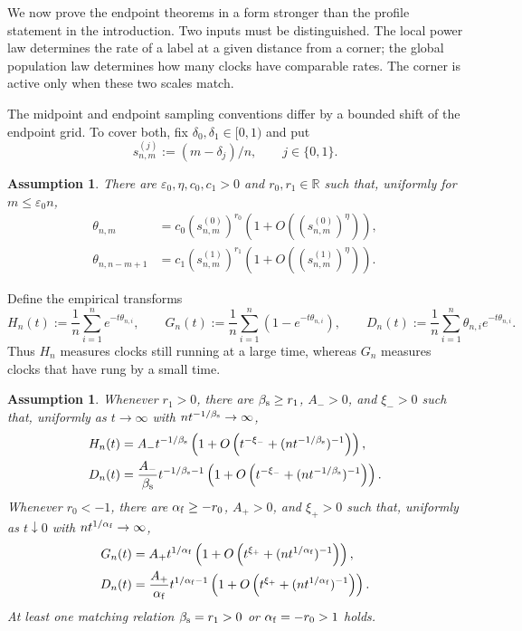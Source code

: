 \documentclass[11pt]{article}
\theoremstyle{remark}
\theoremstyle{plain}
\newtheorem{assumption}[theorem]{Assumption}
\newcommand{\R}{\mathbb R}
\newcommand{\eps}{\varepsilon}
\begin{document}
We now prove the endpoint theorems in a form stronger than the profile
statement in the introduction.  Two inputs must be distinguished.  The local
power law determines the rate of a label at a given distance from a corner;
the global population law determines how many clocks have comparable rates.
The corner is active only when these two scales match.

The midpoint and endpoint sampling conventions differ by a bounded shift of
the endpoint grid.  To cover both, fix $\delta_0,\delta_1\in[0,1)$ and put
\[
 s_{n,m}^{(j)}:=(m-\delta_j)/n,
 \qquad j\in\{0,1\}.
\]

\begin{assumption}\label{ass:power-endpoints}
There are $\eps_0,\eta,c_0,c_1>0$ and $r_0,r_1\in\R$ such that, uniformly for
$m\le \eps_0n$,
\begin{align}
 \theta_{n,m}&=c_0(s_{n,m}^{(0)})^{r_0}
   (1+O((s_{n,m}^{(0)})^{\eta})),\label{eq:left-endpoint-power}\\
 \theta_{n,n-m+1}&=c_1(s_{n,m}^{(1)})^{r_1}
   (1+O((s_{n,m}^{(1)})^{\eta})).\label{eq:right-endpoint-power}
\end{align}
\end{assumption}

Define the empirical transforms
\begin{equation}\label{eq:population-transforms}
 H_n(t):=\frac1n\sum_{i=1}^ne^{-t\theta_{n,i}},\qquad
 G_n(t):=\frac1n\sum_{i=1}^n(1-e^{-t\theta_{n,i}}),\qquad
 D_n(t):=\frac1n\sum_{i=1}^n\theta_{n,i}e^{-t\theta_{n,i}}.
\end{equation}
Thus $H_n$ measures clocks still running at a large time, whereas $G_n$
measures clocks that have rung by a small time.

\begin{assumption}\label{ass:power-population}
Whenever $r_1>0$, there are $\beta_{\rm s}\ge r_1$, $A_->0$, and $\xi_->0$
such that, uniformly as $t\to\infty$ with
$nt^{-1/\beta_{\rm s}}\to\infty$,
\begin{align}
 H_n(t)&=A_-t^{-1/\beta_{\rm s}}
 \left(1+O\left(t^{-\xi_-}
 +(nt^{-1/\beta_{\rm s}})^{-1}\right)\right),
 \label{eq:power-discrete-laplace}\\
 D_n(t)&=\frac{A_-}{\beta_{\rm s}}t^{-1/\beta_{\rm s}-1}
 \left(1+O\left(t^{-\xi_-}
 +(nt^{-1/\beta_{\rm s}})^{-1}\right)\right).
 \label{eq:power-discrete-weighted-laplace}
\end{align}
Whenever $r_0<-1$, there are $\alpha_{\rm f}\ge-r_0$, $A_+>0$, and
$\xi_+>0$ such that, uniformly as $t\downarrow0$ with
$nt^{1/\alpha_{\rm f}}\to\infty$,
\begin{align}
 G_n(t)&=A_+t^{1/\alpha_{\rm f}}
 \left(1+O\left(t^{\xi_+}
 +(nt^{1/\alpha_{\rm f}})^{-1}\right)\right),
 \label{eq:power-discrete-arrivals}\\
 D_n(t)&=\frac{A_+}{\alpha_{\rm f}}t^{1/\alpha_{\rm f}-1}
 \left(1+O\left(t^{\xi_+}
 +(nt^{1/\alpha_{\rm f}})^{-1}\right)\right).
 \label{eq:power-discrete-arrival-weight}
\end{align}
At least one matching relation $\beta_{\rm s}=r_1>0$ or
$\alpha_{\rm f}=-r_0>1$ holds.
\end{assumption}
\end{document}
